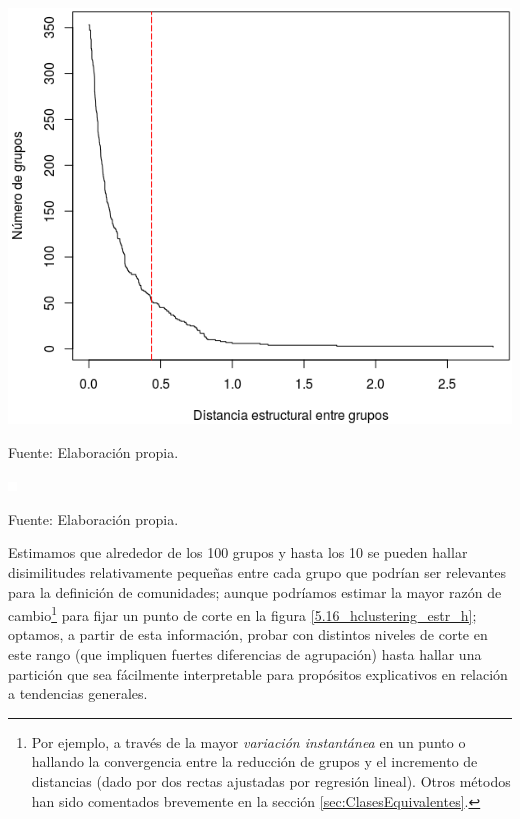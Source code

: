 \documentclass[letterpaper, 11pt]{book}
\theoremstyle{definition}
\theoremstyle{remark}
\begin{document}
\begin{minipage}{\linewidth}
\centering
{} \label{5.16_hclustering_estr_h}
\includegraphics[scale=0.58]{img/5.16_hclustering_estr_h.png}
\par\bigskip
\small Fuente: Elaboración propia. 
\end{minipage}\bigskip



\pagebreak
\hspace{-1em}\begin{minipage}{\linewidth}
\centering
{} \label{5_17_hclustering_str}

\includegraphics[scale=0.1]{img/null.png}
\vspace{54em}
\par\bigskip
\small Fuente: Elaboración propia.
\end{minipage}\bigskip


Estimamos que alrededor de los 100 grupos y hasta los 10 se pueden hallar disimilitudes relativamente pequeñas entre cada grupo que podrían ser relevantes para la definición de comunidades; aunque podríamos estimar la mayor razón de cambio\footnote{
    Por ejemplo, a través de la mayor \emph{variación instantánea} en un punto o hallando la convergencia entre la reducción de grupos y el incremento de distancias (dado por dos rectas ajustadas por regresión lineal). 
    Otros métodos han sido comentados brevemente en la sección \ref{sec:ClasesEquivalentes}. 
} para fijar un punto de corte en la figura \ref{5.16_hclustering_estr_h}; optamos, a partir de esta información, probar con distintos niveles de corte en este rango (que impliquen fuertes diferencias de agrupación) hasta hallar una partición que sea fácilmente interpretable para propósitos explicativos en relación a tendencias generales. 
\end{document}

